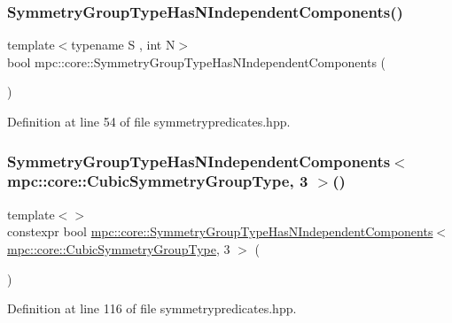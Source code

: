 \subsubsection{\texorpdfstring{Symmetry\+Group\+Type\+Has\+N\+Independent\+Components()}{SymmetryGroupTypeHasNIndependentComponents()}}
{\footnotesize\ttfamily template$<$typename S , int N$>$ \\
bool mpc\+::core\+::\+Symmetry\+Group\+Type\+Has\+N\+Independent\+Components (\begin{DoxyParamCaption}{ }\end{DoxyParamCaption})\hspace{0.3cm}{\ttfamily [inline]}}



Definition at line 54 of file symmetrypredicates.\+hpp.

\mbox{\label{namespacempc_1_1core_a19d52494997193d25a84c367400e8993}} 
\subsubsection{\texorpdfstring{Symmetry\+Group\+Type\+Has\+N\+Independent\+Components$<$ mpc\+::core\+::\+Cubic\+Symmetry\+Group\+Type, 3 $>$()}{SymmetryGroupTypeHasNIndependentComponents< mpc::core::CubicSymmetryGroupType, 3 >()}}
{\footnotesize\ttfamily template$<$$>$ \\
constexpr bool \mbox{\hyperlink{namespacempc_1_1core_a4fc1927e7fe7eb577a6bef4ab6bfb4e4}{mpc\+::core\+::\+Symmetry\+Group\+Type\+Has\+N\+Independent\+Components}}$<$ \mbox{\hyperlink{structmpc_1_1core_1_1_cubic_symmetry_group_type}{mpc\+::core\+::\+Cubic\+Symmetry\+Group\+Type}}, 3 $>$ (\begin{DoxyParamCaption}{ }\end{DoxyParamCaption})\hspace{0.3cm}{\ttfamily [inline]}}



Definition at line 116 of file symmetrypredicates.\+hpp.

